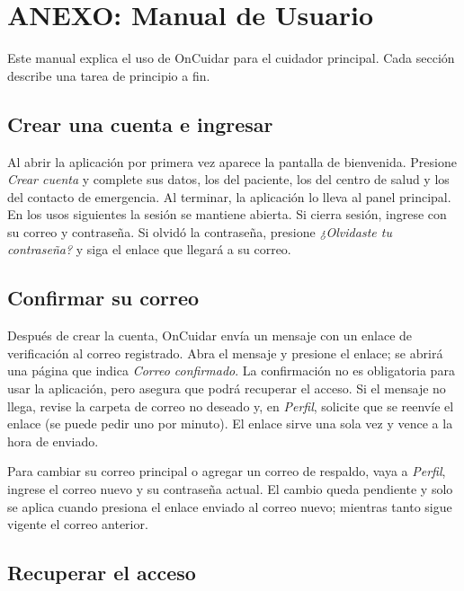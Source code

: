 \chapter[Anexo: Manual de Usuario]{ANEXO: Manual de Usuario}

Este manual explica el uso de OnCuidar para el cuidador principal. Cada sección
describe una tarea de principio a fin.

\section{Crear una cuenta e ingresar}

Al abrir la aplicación por primera vez aparece la pantalla de bienvenida.
Presione \emph{Crear cuenta} y complete sus datos, los del paciente, los del
centro de salud y los del contacto de emergencia. Al terminar, la aplicación lo
lleva al panel principal. En los usos siguientes la sesión se mantiene abierta.
Si cierra sesión, ingrese con su correo y contraseña. Si olvidó la contraseña,
presione \emph{¿Olvidaste tu contraseña?} y siga el enlace que llegará a su
correo.


\section{Confirmar su correo}

Después de crear la cuenta, OnCuidar envía un mensaje con un enlace de
verificación al correo registrado. Abra el mensaje y presione el enlace; se
abrirá una página que indica \emph{Correo confirmado}. La confirmación no es
obligatoria para usar la aplicación, pero asegura que podrá recuperar el acceso.
Si el mensaje no llega, revise la carpeta de correo no deseado y, en
\emph{Perfil}, solicite que se reenvíe el enlace (se puede pedir uno por minuto).
El enlace sirve una sola vez y vence a la hora de enviado.

Para cambiar su correo principal o agregar un correo de respaldo, vaya a
\emph{Perfil}, ingrese el correo nuevo y su contraseña actual. El cambio queda
pendiente y solo se aplica cuando presiona el enlace enviado al correo nuevo;
mientras tanto sigue vigente el correo anterior.


\section{Recuperar el acceso}

